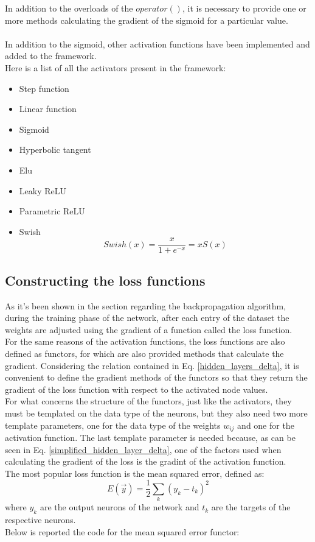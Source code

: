 \documentclass[12pt]{article}
\begin{document}


\noindent In addition to the overloads of the $operator()$, it is necessary to provide one or more methods calculating
the gradient of the sigmoid for a particular value. \\ \\
In addition to the sigmoid, other activation functions have been implemented and added to the framework. \\
Here is a list of all the activators present in the framework:
\begin{itemize}
  \item Step function
  \item Linear function
  \item Sigmoid 
  \item Hyperbolic tangent
  \item Elu
  \item Leaky ReLU
  \item Parametric ReLU
  \item Swish
  $$
	Swish(x) = \frac{x}{1 + e^{-x}} = x S(x)
  $$	
\end{itemize}

\subsection{Constructing the loss functions}
As it's been shown in the section regarding the backpropagation algorithm, during the training phase of the
network, after each entry of the dataset the weights are adjusted using the gradient of a function called 
the loss function. \\
For the same reasons of the activation functions, the loss functions are also defined as functors, for which 
are also provided methods that calculate the gradient. Considering the relation contained in Eq. 
\ref{hidden_layers_delta}, it is convenient to define the gradient methods of the functors so that they 
return the gradient of the loss function with respect to the activated node values. \\
For what concerns the structure of the functors, just like the activators, they must be templated on the 
data type of the neurons, but they also need two more template parameters, one for the data type of the 
weights $w_{ij}$ and one for the activation function. The last template parameter is needed because, as 
can be seen in Eq. \ref{simplified_hidden_layer_delta}, one of the factors used when calculating the gradient
of the loss is the gradint of the activation function. \\
The most popular loss function is the mean squared error, defined as:
\begin{equation}
  E(\vec{y}) = \frac{1}{2}\sum_k (y_k - t_k)^2
\end{equation}
where $y_k$ are the output neurons of the network and $t_k$ are the targets of the respective neurons. \\
Below is reported the code for the mean squared error functor:
\end{document}
